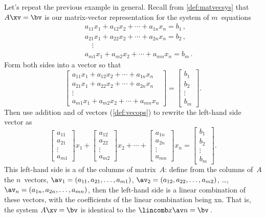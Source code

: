 \begin{example} \label{eg:lcmatvec}
Let's repeat the previous example in general.
Recall from \cref{def:matvecsys} that \(A\xv=\bv\) is our matrix-vector representation for the system of \(m\)~equations
\begin{eqnarray*}
&&a_{11}x_1+a_{12}x_2+\cdots+a_{1n}x_n=b_1\,,
\\&&a_{21}x_1+a_{22}x_2+\cdots+a_{2n}x_n=b_2\,,
\\&&\quad\vdots
\\&&a_{m1}x_1+a_{m2}x_2+\cdots+a_{mn}x_n=b_m\,.
\end{eqnarray*}
Form both sides into a vector so that
\begin{equation*}
\begin{bmatrix} 
a_{11}x_1+a_{12}x_2+\cdots+a_{1n}x_n
\\a_{21}x_1+a_{22}x_2+\cdots+a_{2n}x_n
\\\vdots
\\a_{m1}x_1+a_{m2}x_2+\cdots+a_{mn}x_n
\end{bmatrix}
=\begin{bmatrix}b_1\\b_2\\\vdots\\b_m \end{bmatrix}.
\end{equation*}
Then use addition and  of vectors (\cref{def:vecops}) to rewrite the left-hand side vector as
\begin{equation*}
\begin{bmatrix} a_{11}\\a_{21}\\\vdots\\a_{m1}\end{bmatrix}x_1
+\begin{bmatrix} a_{12}\\a_{22}\\\vdots\\a_{m2}\end{bmatrix}x_2
+\cdots
+\begin{bmatrix} a_{1n}\\a_{2n}\\\vdots\\a_{mn}\end{bmatrix}x_n
=\begin{bmatrix} b_1\\b_2\\\vdots\\b_m \end{bmatrix}.
\end{equation*}
This left-hand side is a  of the columns of matrix~\(A\): define from the columns of~\(A\) the \(n\)~vectors, \(\av_1=(a_{11},a_{21},\ldots,a_{m1})\), \(\av_2=(a_{12},a_{22},\ldots,a_{m2})\), \ldots, \(\av_n=(a_{1n},a_{2n},\ldots,a_{mn})\), then the left-hand side is a linear combination of these vectors, with the coefficients of the linear combination being \hlist xn.
That is, the system \(A\xv=\bv\) is identical to the  \(\lincomb x\av n=\bv\)\,.
\end{example}

